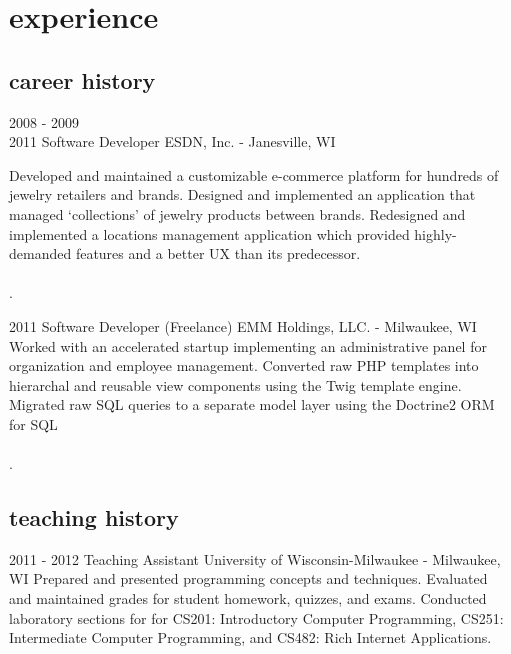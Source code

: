 \documentclass[]{fritz-resume}
\begin{document}

\section{experience}

\subsection{career history}

\begin{entrylist}
	\entry
		{2008 - 2009 \\ 2011}
		{Software Developer}
		{ESDN, Inc. - Janesville, WI}
		{
			Developed and maintained a customizable e-commerce platform for hundreds of jewelry retailers and brands. Designed and implemented an application that managed `collections' of jewelry products between brands. Redesigned and implemented a locations management application which provided highly-demanded features and a better UX than its predecessor. \\\\ .
			
		}
	
	\entry
		{2011}
		{Software Developer (Freelance)}
		{EMM Holdings, LLC. - Milwaukee, WI}
		{
			Worked with an accelerated startup implementing an administrative panel for organization and employee management. Converted raw PHP templates into hierarchal and reusable view components using the Twig template engine. Migrated raw SQL queries to a separate model layer using the Doctrine2 ORM for SQL\\\\ .
		}
\end{entrylist}

\subsection{teaching history}

\begin{entrylist}
	\entry
		{2011 - 2012}
		{Teaching Assistant}
		{University of Wisconsin-Milwaukee - Milwaukee, WI}
		{
			Prepared and presented programming concepts and techniques. Evaluated and maintained grades for student homework, quizzes, and exams. Conducted laboratory sections for for CS201: Introductory Computer Programming, CS251: Intermediate Computer Programming, and CS482: Rich Internet Applications. 
		}
\end{entrylist}
\end{document}

